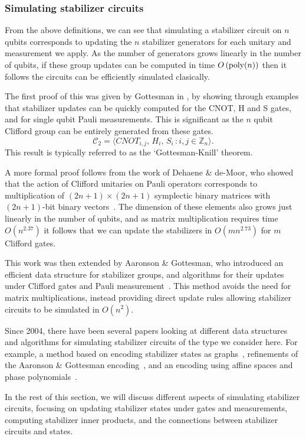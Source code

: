\subsubsection*{Simulating stabilizer circuits}
From the above definitions, we can see that simulating a stabilizer circuit on $n$ qubits corresponds to updating the $n$ stabilizer generators for each unitary and measurement we apply. As the number of generators grows linearly in the number of qubits, if these group updates can be computed in time $O\left(\text{poly} (n)\right)$ then it follows the circuits can be efficiently simulated clasically.\par
The first proof of this was given by Gottesman in \cite{Gottesman1998b}, by showing through examples that stabilizer updates can be quickly computed for the CNOT, H and S gates, and for single qubit Pauli measurements. This is significant as the $n$ qubit Clifford group can be entirely generated from these gates.
\begin{equation}
    \mathcal{C}_{2} = \langle CNOT_{i,j},\, H_{i},\, S_{i}\,:i,j\in \mathbb{Z}_{n}\rangle. \label{eq:cliffordgen}
\end{equation}
This result is typically referred to as the `Gottesman-Knill' theorem.\par
A more formal proof follows from the work of Dehaene \& de-Moor, who showed that the action of Clifford unitaries on Pauli operators corresponds to multiplication of $(2n+1)\times (2n+1)$ symplectic binary matrices with $(2n+1)$-bit binary vectors~\cite{Dehaene2003}. The dimension of these elements also grows just linearly in the number of qubits, and as matrix multiplication requires time $O(n^{2.37})$ it follows that we can update the stabilizers in $O(mn^{2.73})$ for $m$ Clifford gates.\par
This work was then extended by Aaronson \& Gottesman, who introduced an efficient data structure for stabilizer groups, and algorithms for their updates under Clifford gates and Pauli measurement~\cite{Aaronson2004}. This method avoids the need for matrix multiplications, instead providing direct update rules allowing stabilizer circuits to be simulated in $O(n^{2})$.\par
Since 2004, there have been several papers looking at different data structures and algorithms for simulating stabilizer circuits of the type we consider here. For example, a method based on encoding stabilizer states as graphs~\cite{Anders2006}, refinements of the Aaronson \& Gottesman encoding~\cite{Garcia2012}, and an encoding using affine spaces and phase polynomials~\cite{VandenNest2008,Bravyi2016}.\par
In the rest of this section, we will discuss different aspects of simulating stabilizer circuits, focusing on updating stabilizer states under gates and measurements, computing stabilizer inner products, and the connections between stabilizer circuits and states.
